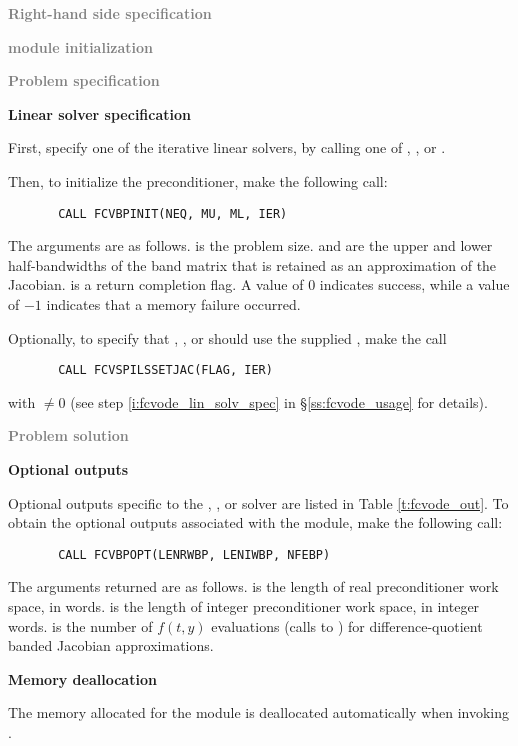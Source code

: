 \begin{Steps}
  
\item \textcolor{gray}{\bf Right-hand side specification}

\item \textcolor{gray}{\bf {\nvector} module initialization}

\item \textcolor{gray}{\bf Problem specification}

\item {\bf Linear solver specification}

  First, specify one of the {\cvspils} iterative linear solvers, by calling
  one of , , or .

  Then, to initialize the {\cvbandpre} preconditioner, make the following call:
\begin{verbatim}
       CALL FCVBPINIT(NEQ, MU, ML, IER)
\end{verbatim}
  The arguments are as follows.
   is the problem size.
   and  are the upper and lower half-bandwidths of the band matrix
  that  is retained as an approximation of the Jacobian.
   is a return completion flag.  A value of $0$ indicates success, while 
  a value of $-1$ indicates that a memory failure occurred.
    
  Optionally, to specify that {\spgmr}, {\spbcg}, or {\sptfqmr} should use 
  the supplied , make the call
\begin{verbatim}
       CALL FCVSPILSSETJAC(FLAG, IER)
\end{verbatim}
  with  $\neq 0$ 
  (see step \ref{i:fcvode_lin_solv_spec} in \S\ref{ss:fcvode_usage} for details).
  
\item \textcolor{gray}{\bf Problem solution}
  
\item {\bf {\cvbandpre} Optional outputs}
  
  Optional outputs specific to the {\spgmr}, {\spbcg}, or {\sptfqmr} solver are 
  listed in Table \ref{t:fcvode_out}.
  To obtain the optional outputs associated with the {\cvbandpre} module, make
  the following call:
\begin{verbatim}
       CALL FCVBPOPT(LENRWBP, LENIWBP, NFEBP)
\end{verbatim}
  The arguments returned are as follows.
   is the length of real preconditioner work space, in 
  words.  is the length of integer preconditioner work space, in
  integer words.  is the number of $f(t,y)$ evaluations (calls to
  ) for difference-quotient banded Jacobian approximations.
  
\item {\bf Memory deallocation}

  The memory allocated for the {\fcvbp} module is deallocated automatically
  when invoking .

\end{Steps}
